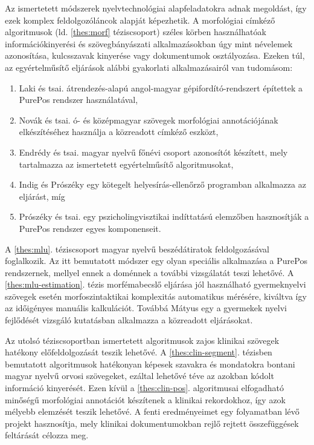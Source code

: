 Az ismertetett módszerek nyelvtechnológiai alapfeladatokra adnak megoldást, így ezek komplex feldolgozóláncok alapját képezhetik.
A morfológiai címkéző algoritmusok (ld. \ref{thes:morf} téziscsoport) széles körben használhatóak információkinyerési és szövegbányászati alkalmazásokban úgy mint névelemek azonosítása, kulcsszavak kinyerése vagy dokumentumok osztályozása.
Ezeken túl, az egyértelműsítő eljárások alábbi gyakorlati alkalmazásairól van tudomásom:
\begin{enumerate} %
\item Laki és tsai. átrendezés-alapú angol-magyar gépifordító-rendszert \cite{Laki2013} építettek a PurePos rendszer használatával,
\item Novák és tsai. ó- és középmagyar szövegek morfológiai annotációjának elkészítéséhez használja \cite{Novak2013} a közreadott címkéző eszközt,
\item Endrédy és tsai. \cite{Endredy2014} magyar nyelvű főnévi csoport azonosítót készített, mely tartalmazza az ismertetett egyértelműsítő algoritmusokat,
\item Indig és Prószéky \cite{Indig2013} egy kötegelt helyesírás-ellenőrző programban alkalmazza az eljárást, míg
\item Prószéky és tsai. egy pszicholingvisztikai indíttatású elemzőben hasznosítják \cite{Proszeky2014} a PurePos rendszer egyes komponenseit.
\end{enumerate}

A \ref{thes:mlu}. téziscsoport magyar nyelvű beszédátiratok feldolgozásával foglalkozik. 
Az itt bemutatott módszer egy olyan speciális alkalmazása a PurePos rendszernek, mellyel ennek a doménnek a további vizsgálatát teszi lehetővé.
A \ref{thes:mlu-estimation}. tézis morfémabecslő eljárása jól használható gyermeknyelvi szövegek esetén morfoszintaktikai komplexitás automatikus mérésére, kiváltva így az időigényes manuális kalkulációt.
Továbbá Mátyus \cite{Matyus2014b} egy a gyermekek nyelvi fejlődését vizsgáló kutatásban alkalmazza a közreadott eljárásokat. 

Az utolsó téziscsoportban ismertetett algoritmusok zajos klinikai szövegek hatékony előfeldolgozását teszik lehetővé.
A \ref{thes:clin-segment}. tézisben bemutatott algoritmusok hatékonyan képesek szavakra és mondatokra bontani magyar nyelvű orvosi szövegeket, ezáltal lehetővé téve az azokban kódolt információ kinyerését. 
Ezen kívül a \ref{thes:clin-pos}. algoritmusai elfogadható minőségű morfológiai annotációt készítenek a klinikai rekordokhoz, így azok mélyebb elemzését teszik lehetővé.
A fenti eredményeimet egy folyamatban lévő projekt \cite{Siklosi2014,Siklosi2014mszny} hasznosítja, mely klinikai dokumentumokban rejlő rejtett összefüggések feltárását célozza  meg.


